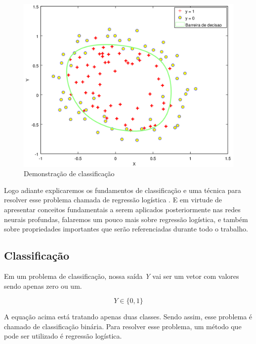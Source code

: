 \begin{figure}[htb]
  \caption{Demonstração de classificação}\label{fig:demclassificacao}
  \begin{center}
      \includegraphics[scale=0.75]{img/classificacao2}
  \end{center}
\end{figure}


Logo adiante explicaremos os fundamentos de classificação e uma técnica para resolver esse problema chamada de regressão logística \cite{hosmer2004applied}. E em virtude de apresentar conceitos fundamentais a serem aplicados posteriormente nas redes neurais profundas, falaremos um pouco mais sobre regressão logística, e também sobre propriedades importantes que serão referenciadas durante todo o trabalho.

\subsection{Classificação}

Em um problema de classificação, nossa saída \textit{Y} vai ser um vetor com valores sendo apenas zero ou um.

\begin{equation}
Y \in \{0, 1\} \nonumber
\end{equation}

A equação acima está tratando apenas duas classes. Sendo assim, esse problema é chamado de classificação binária. Para resolver esse problema, um método que pode ser utilizado é regressão logística.

